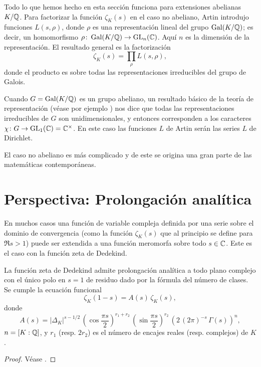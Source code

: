 \begin{comentario}
  Todo lo que hemos hecho en esta sección funciona para extensiones abelianas
  $K/\mathbb{Q}$. Para factorizar la función $\zeta_K (s)$ en el caso no abeliano,
  Artin introdujo funciones $L (s,\rho)$, donde $\rho$ es una representación
  lineal del grupo $\operatorname{Gal} (K/\mathbb{Q})$; es decir, un homomorfismo
  $\rho\colon \operatorname{Gal} (K/\mathbb{Q}) \to \operatorname{GL}_n (\mathbb{C})$. Aquí $n$ es la dimensión de
  la representación. El resultado general es la factorización
  $$\zeta_K (s) = \prod_\rho L (s,\rho),$$
  donde el producto es sobre todas las representaciones irreducibles del grupo
  de Galois.

  Cuando $G = \operatorname{Gal} (K/\mathbb{Q})$ es un grupo abeliano, un resultado básico de
  la teoría de representación (véase por ejemplo \cite{Serre-RLGF}) nos dice que
  todas las representaciones irreducibles de $G$ son unidimensionales, y
  entonces corresponden a los caracteres
  $\chi\colon G \to \operatorname{GL}_1 (\mathbb{C}) = \mathbb{C}^\times$. En este caso las funciones $L$
  de Artin serán las series $L$ de Dirichlet.

  El caso no abeliano es más complicado y de este se origina una gran parte de
  las matemáticas contemporáneas.
\end{comentario}


\section{Perspectiva: Prolongación analítica}

En muchos casos una función de variable compleja definida por una serie sobre
el dominio de convergencia (como la función $\zeta_K (s)$ que al principio se
define para $\Re s > 1$) puede ser extendida a una función meromorfa sobre todo
$s \in \mathbb{C}$. Este es el caso con la función zeta de Dedekind.

\begin{teorema}
  La función zeta de Dedekind admite prolongación analítica a todo plano
  complejo con el único polo en $s = 1$ de residuo dado por la fórmula del
  número de clases. Se cumple la ecuación funcional
  $$\zeta_K (1-s) = A(s)\,\zeta_K (s),$$
  donde
  $$A (s) = |\Delta_K|^{s - 1/2}\,\left(\cos\frac{\pi s}{2}\right)^{r_1+r_2}\,\left(\sin\frac{\pi s}{2}\right)^{r_2}\,\left(2\,(2\pi)^{-s}\,\Gamma (s)\right)^n,$$
  $n = [K : \mathbb{Q}]$, y $r_1$ (resp. $2 r_2$) es el número de encajes reales
  (resp. complejos) de $K$.

  \begin{proof}
    Véase \cite[\S VII.5]{Neukirch-ANT}.
  \end{proof}
\end{teorema}


